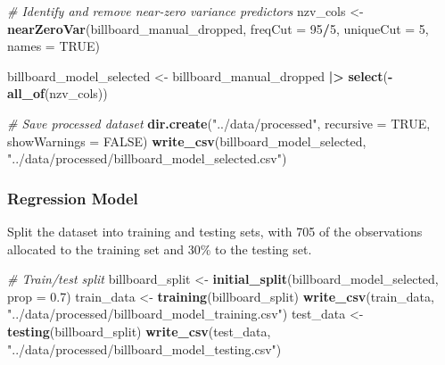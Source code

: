 \documentclass[
]{article}
\newenvironment{Shaded}{\begin{snugshade}}{\end{snugshade}}
\newcommand{\AttributeTok}[1]{\textcolor[rgb]{0.13,0.29,0.53}{#1}}
\newcommand{\CommentTok}[1]{\textcolor[rgb]{0.56,0.35,0.01}{\textit{#1}}}
\newcommand{\ConstantTok}[1]{\textcolor[rgb]{0.56,0.35,0.01}{#1}}
\newcommand{\DecValTok}[1]{\textcolor[rgb]{0.00,0.00,0.81}{#1}}
\newcommand{\FloatTok}[1]{\textcolor[rgb]{0.00,0.00,0.81}{#1}}
\newcommand{\FunctionTok}[1]{\textcolor[rgb]{0.13,0.29,0.53}{\textbf{#1}}}
\newcommand{\NormalTok}[1]{#1}
\newcommand{\OtherTok}[1]{\textcolor[rgb]{0.56,0.35,0.01}{#1}}
\newcommand{\SpecialCharTok}[1]{\textcolor[rgb]{0.81,0.36,0.00}{\textbf{#1}}}
\newcommand{\StringTok}[1]{\textcolor[rgb]{0.31,0.60,0.02}{#1}}
\begin{document}
\begin{Shaded}
\begin{Highlighting}[]
\CommentTok{\# Identify and remove near{-}zero variance predictors}
\NormalTok{nzv\_cols }\OtherTok{\textless{}{-}} \FunctionTok{nearZeroVar}\NormalTok{(billboard\_manual\_dropped, }
                        \AttributeTok{freqCut =} \DecValTok{95}\SpecialCharTok{/}\DecValTok{5}\NormalTok{,  }
                        \AttributeTok{uniqueCut =} \DecValTok{5}\NormalTok{,}
                        \AttributeTok{names =} \ConstantTok{TRUE}\NormalTok{)}

\NormalTok{billboard\_model\_selected }\OtherTok{\textless{}{-}}\NormalTok{ billboard\_manual\_dropped }\SpecialCharTok{|\textgreater{}}
  \FunctionTok{select}\NormalTok{(}\SpecialCharTok{{-}}\FunctionTok{all\_of}\NormalTok{(nzv\_cols))}
\end{Highlighting}
\end{Shaded}

\begin{Shaded}
\begin{Highlighting}[]
\CommentTok{\# Save processed dataset}
\FunctionTok{dir.create}\NormalTok{(}\StringTok{"../data/processed"}\NormalTok{, }\AttributeTok{recursive =} \ConstantTok{TRUE}\NormalTok{, }\AttributeTok{showWarnings =} \ConstantTok{FALSE}\NormalTok{)}
\FunctionTok{write\_csv}\NormalTok{(billboard\_model\_selected, }\StringTok{"../data/processed/billboard\_model\_selected.csv"}\NormalTok{)}
\end{Highlighting}
\end{Shaded}

\subsubsection{Regression Model}\label{regression-model}

Split the dataset into training and testing sets, with 705 of the
observations allocated to the training set and 30\% to the testing set.

\begin{Shaded}
\begin{Highlighting}[]
\CommentTok{\# Train/test split}
\NormalTok{billboard\_split }\OtherTok{\textless{}{-}} \FunctionTok{initial\_split}\NormalTok{(billboard\_model\_selected, }\AttributeTok{prop =} \FloatTok{0.7}\NormalTok{)}
\NormalTok{train\_data }\OtherTok{\textless{}{-}} \FunctionTok{training}\NormalTok{(billboard\_split)}
\FunctionTok{write\_csv}\NormalTok{(train\_data, }\StringTok{"../data/processed/billboard\_model\_training.csv"}\NormalTok{)}
\NormalTok{test\_data }\OtherTok{\textless{}{-}} \FunctionTok{testing}\NormalTok{(billboard\_split)}
\FunctionTok{write\_csv}\NormalTok{(test\_data, }\StringTok{"../data/processed/billboard\_model\_testing.csv"}\NormalTok{)}
\end{Highlighting}
\end{Shaded}
\end{document}
